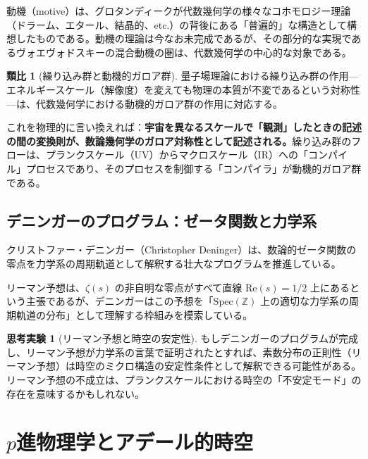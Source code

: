 \documentclass[12pt,a4paper]{ltjsarticle}
\theoremstyle{definition}
\newtheorem{analogy}[definition]{類比}
\newtheorem{thought}[definition]{思考実験}
\begin{document}
動機（motive）は、グロタンディークが代数幾何学の様々なコホモロジー理論（ドラーム、エタール、結晶的、etc.）の背後にある「普遍的」な構造として構想したものである\cite{Grothendieck1969}。動機の理論は今なお未完成であるが、その部分的な実現であるヴォエヴォドスキーの混合動機の圏\cite{Voevodsky2000}は、代数幾何学の中心的な対象である。

\begin{analogy}[繰り込み群と動機的ガロア群]
量子場理論における繰り込み群の作用---エネルギースケール（解像度）を変えても物理の本質が不変であるという対称性---は、代数幾何学における動機的ガロア群の作用に対応する。

これを物理的に言い換えれば：\textbf{宇宙を異なるスケールで「観測」したときの記述の間の変換則が、数論幾何学のガロア対称性として記述される。}繰り込み群のフローは、プランクスケール（UV）からマクロスケール（IR）への「コンパイル」プロセスであり、そのプロセスを制御する「コンパイラ」が動機的ガロア群である。
\end{analogy}

\subsection{デニンガーのプログラム：ゼータ関数と力学系}

クリストファー・デニンガー（Christopher Deninger）は、数論的ゼータ関数の零点を力学系の周期軌道として解釈する壮大なプログラムを推進している\cite{Deninger1998, Deninger2002}。

リーマン予想は、$\zeta(s)$ の非自明な零点がすべて直線 $\mathrm{Re}(s) = 1/2$ 上にあるという主張であるが、デニンガーはこの予想を「$\mathrm{Spec}(\mathbb{Z})$ 上の適切な力学系の周期軌道の分布」として理解する枠組みを模索している。

\begin{thought}[リーマン予想と時空の安定性]
もしデニンガーのプログラムが完成し、リーマン予想が力学系の言葉で証明されたとすれば、素数分布の正則性（リーマン予想）は時空のミクロ構造の安定性条件として解釈できる可能性がある。リーマン予想の不成立は、プランクスケールにおける時空の「不安定モード」の存在を意味するかもしれない。
\end{thought}


\newpage
\section{$p$進物理学とアデール的時空}
\label{sec:padic}
\end{document}
